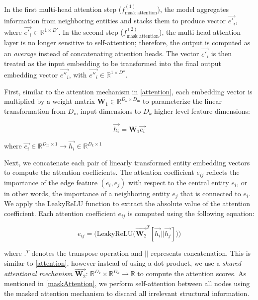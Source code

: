 In the first multi-head attention step ($f_{\text{mask attention}}^{(1)}$), the model aggregates information from neighboring entities and stacks them to produce vector $\overrightarrow{e'_i}$, where $\overrightarrow{e'_i} \in \mathbb{R}^{1 \times D'}$. In the second step ($f_{\text{mask attention}}^{(2)}$), the multi-head attention layer is no longer sensitive to self-attention; therefore, the output is computed as an \textit{average} instead of concatenating attention heads. The vector $\overrightarrow{e'_i}$ is then treated as the input embedding to be transformed into the final output embedding vector $\overrightarrow{e''_i}$, with $\overrightarrow{e''_i} \in \mathbb{R}^{1 \times D''}$.

First, similar to the attention mechanism in \ref{attention}, each embedding vector is multiplied by a weight matrix $\mathbf{W}_1 \in \mathbb{R}^{D_k \times D_{\text{in}}}$ to parameterize the linear transformation from $D_{\text{in}}$ input dimensions to $D_k$ higher-level feature dimensions:

\begin{equation}
	\overrightarrow{h_i} = \mathbf{W}_{1} \overrightarrow{e_i}
\end{equation}

where $\overrightarrow{e_i} \in \mathbb{R}^{D_{\text{in}} \times 1}
\xrightarrow{} \overrightarrow{h_i} \in \mathbb{R}^{D_k \times 1}$


Next, we concatenate each pair of linearly transformed entity embedding vectors to compute the attention coefficients. The attention coefficient $e_{ij}$ reflects the importance of the edge feature $(e_i, e_j)$ with respect to the central entity $e_i$, or in other words, the importance of a neighboring entity $e_j$ that is connected to $e_i$. We apply the $\text{LeakyReLU}$ function to extract the absolute value of the attention coefficient. Each attention coefficient $e_{ij}$ is computed using the following equation:

\begin{equation}
	e_{ij} = \Big( \text{LeakyReLU} \Big( \overrightarrow{\mathbf{W}_{2}}^{T} [\overrightarrow{h_i} || \overrightarrow{h_j}]\Big) \Big)
\end{equation}

where ${.}^{T}$ denotes the transpose operation and $||$ represents concatenation. This is similar to \ref{attention}, however instead of using a dot product, we use a \textit{shared attentional mechanism} $\overrightarrow{\mathbf{W}_2}$: $\mathbb{R}^{D_k} \times \mathbb{R}^{D_k} \rightarrow \mathbb{R}$ to compute the attention scores. As mentioned in \ref{maskAttention}, we perform self-attention between all nodes using the masked attention mechanism to discard all irrelevant structural information.

